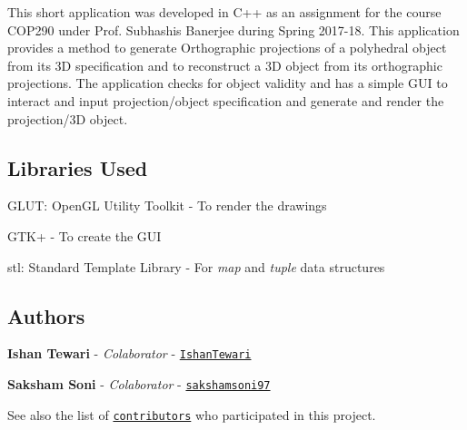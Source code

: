 This short application was developed in C++ as an assignment for the course C\+O\+P290 under Prof. Subhashis Banerjee during Spring 2017-\/18. This application provides a method to generate Orthographic projections of a polyhedral object from its 3D specification and to reconstruct a 3D object from its orthographic projections. The application checks for object validity and has a simple G\+UI to interact and input projection/object specification and generate and render the projection/3D object.

\subsection*{Libraries Used}


\begin{DoxyItemize}
\item G\+L\+UT\+: Open\+GL Utility Toolkit -\/ To render the drawings
\item G\+T\+K+ -\/ To create the G\+UI
\item stl\+: Standard Template Library -\/ For {\itshape map} and {\itshape tuple} data structures
\end{DoxyItemize}

\subsection*{Authors}


\begin{DoxyItemize}
\item {\bfseries Ishan Tewari} -\/ {\itshape Colaborator} -\/ \href{https://github.com/IshanTewari}{\tt Ishan\+Tewari}
\item {\bfseries Saksham Soni} -\/ {\itshape Colaborator} -\/ \href{https://github.com/sakshamsoni97}{\tt sakshamsoni97}
\end{DoxyItemize}

See also the list of \href{https://github.com/your/project/contributors}{\tt contributors} who participated in this project. 